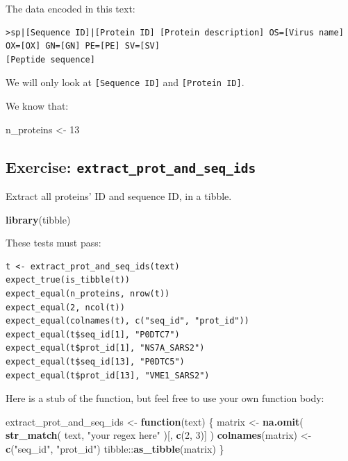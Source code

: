\documentclass[]{book}
\newenvironment{Shaded}{}{}
\newcommand{\ControlFlowTok}[1]{\textcolor[rgb]{0.00,0.44,0.13}{\textbf{#1}}}
\newcommand{\DecValTok}[1]{\textcolor[rgb]{0.25,0.63,0.44}{#1}}
\newcommand{\KeywordTok}[1]{\textcolor[rgb]{0.00,0.44,0.13}{\textbf{#1}}}
\newcommand{\NormalTok}[1]{#1}
\newcommand{\OperatorTok}[1]{\textcolor[rgb]{0.40,0.40,0.40}{#1}}
\newcommand{\StringTok}[1]{\textcolor[rgb]{0.25,0.44,0.63}{#1}}
\begin{document}
The data encoded in this text:

\begin{verbatim}
>sp|[Sequence ID]|[Protein ID] [Protein description] OS=[Virus name] OX=[OX] GN=[GN] PE=[PE] SV=[SV]
[Peptide sequence]
\end{verbatim}

We will only look at \texttt{{[}Sequence\ ID{]}} and \texttt{{[}Protein\ ID{]}}.

We know that:

\begin{Shaded}
\begin{Highlighting}[]
\NormalTok{n_proteins <-}\StringTok{ }\DecValTok{13}
\end{Highlighting}
\end{Shaded}

\hypertarget{exercise-extract_prot_and_seq_ids}{%
\subsection{\texorpdfstring{Exercise: \texttt{extract\_prot\_and\_seq\_ids}}{Exercise: extract\_prot\_and\_seq\_ids}}\label{exercise-extract_prot_and_seq_ids}}

Extract all proteins' ID and sequence ID, in a tibble.

\begin{Shaded}
\begin{Highlighting}[]
\KeywordTok{library}\NormalTok{(tibble)}
\end{Highlighting}
\end{Shaded}

These tests must pass:

\begin{verbatim}
t <- extract_prot_and_seq_ids(text)
expect_true(is_tibble(t))
expect_equal(n_proteins, nrow(t))
expect_equal(2, ncol(t))
expect_equal(colnames(t), c("seq_id", "prot_id"))
expect_equal(t$seq_id[1], "P0DTC7")
expect_equal(t$prot_id[1], "NS7A_SARS2")
expect_equal(t$seq_id[13], "P0DTC5")
expect_equal(t$prot_id[13], "VME1_SARS2")
\end{verbatim}

Here is a stub of the function, but feel free to use your own function body:

\begin{Shaded}
\begin{Highlighting}[]
\NormalTok{extract_prot_and_seq_ids <-}\StringTok{ }\ControlFlowTok{function}\NormalTok{(text) \{}
\NormalTok{  matrix <-}\StringTok{ }\KeywordTok{na.omit}\NormalTok{(}
    \KeywordTok{str_match}\NormalTok{(}
\NormalTok{      text,}
      \StringTok{"your regex here"}
\NormalTok{    )[, }\KeywordTok{c}\NormalTok{(}\DecValTok{2}\NormalTok{, }\DecValTok{3}\NormalTok{)]}
\NormalTok{  )}
  \KeywordTok{colnames}\NormalTok{(matrix) <-}\StringTok{ }\KeywordTok{c}\NormalTok{(}\StringTok{"seq_id"}\NormalTok{, }\StringTok{"prot_id"}\NormalTok{)}
\NormalTok{  tibble}\OperatorTok{::}\KeywordTok{as_tibble}\NormalTok{(matrix)}
\NormalTok{\}}
\end{Highlighting}
\end{Shaded}
\end{document}
